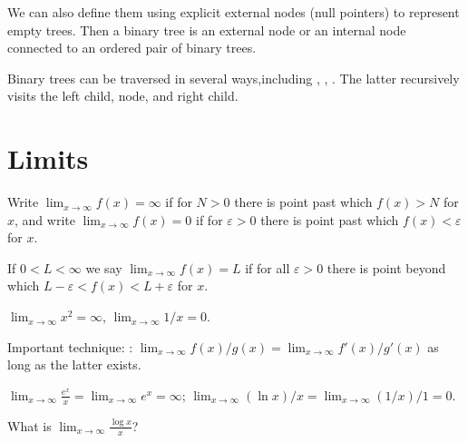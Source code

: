 We can also define them using explicit external nodes (null pointers) to represent empty trees. Then a binary tree is an external node or an internal node connected to an ordered pair of binary trees.
 
Binary trees can be traversed in several ways,including , , . The latter recursively visits the left child, node, and right child.

\section{Limits}

Write $\lim_{x\to \infty} f(x) = \infty$ if for  $N>0$ there is  point past which $f(x) > N$ for  $x$, and write $\lim_{x\to\infty} f(x) = 0$ if for  $\varepsilon>0$ there is  point past which $f(x) < \varepsilon$ for  $x$.

If $0 < L < \infty$ we say $\lim_{x\to\infty} f(x) = L$ if for all $\varepsilon > 0$ there is  point beyond which $L - \varepsilon < f(x) < L + \varepsilon$ for  $x$.

\begin{Example}
$\lim_{x\to\infty} x^2 = \infty$, $\lim_{x\to \infty} 1/x = 0$.
\end{Example}

Important technique: : $\lim_{x\to \infty} f(x)/g(x) = \lim_{x\to \infty} f'(x)/g'(x)$ as long as the latter exists. 

\begin{Example}
 $\lim_{x\to\infty} \frac{e^x}{x} = \lim_{x\to\infty} e^x = \infty$; $\lim_{x\to\infty} (\ln x)/x = \lim_{x\to\infty} (1/x)/1 = 0$.
 \end{Example}
 
 \begin{Boxample}[5]
What is  $\lim_{x\to\infty} \frac{\log x}{x}$?
 
 \end{Boxample}



